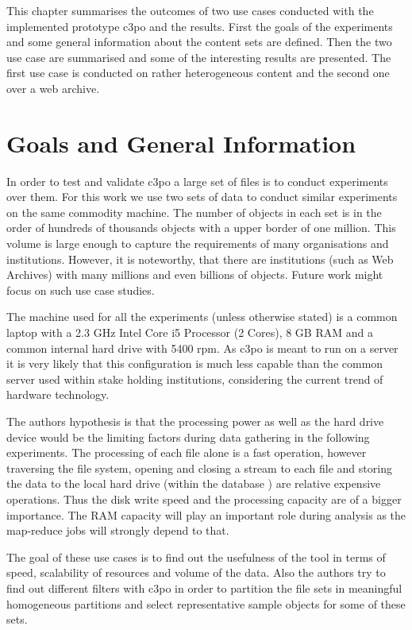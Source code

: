 This chapter summarises the outcomes of two use cases conducted with the implemented prototype c3po and
the results. First the goals of the experiments and some general information about the content sets are defined. Then the two use case are summarised and some of the interesting results are presented. The first use case is conducted on rather heterogeneous content and the second one over a web archive.

\section{Goals and General Information}
In order to test and validate c3po a large set of files is to conduct experiments over them.
For this work we use two sets of data to conduct similar experiments on the same commodity machine. The number of objects in each set is in the order of hundreds of thousands objects with a upper border of one million. This volume is large enough to capture the requirements of many organisations and institutions. However, it is noteworthy, that there are institutions (such as Web Archives) with many millions and even billions of objects. Future work might focus on such use case studies.

The machine used for all the experiments (unless otherwise stated) is a common laptop with a 2.3 GHz Intel Core i5 Processor (2 Cores), 8 GB RAM and a common internal hard drive with 5400 rpm. As c3po is meant to run on a server it is very likely that this configuration is much less capable than the common server used within stake holding institutions, considering the current trend of hardware technology.

The authors hypothesis is that the processing power as well as the hard drive device would be the limiting factors during data gathering in the following experiments. The  processing of each file alone is a fast operation, however traversing the file system, opening and closing a stream to each file and storing the data to the local hard drive (within the database ) are relative expensive operations. Thus the disk write speed and the processing capacity are of a bigger importance. The RAM capacity will play an important role during analysis as the map-reduce jobs will strongly depend to that.

The goal of these use cases is to find out the usefulness of the tool in terms of speed, scalability of resources and volume of the data. Also the authors try to find out different filters with c3po in order to partition the file sets in meaningful homogeneous partitions and select representative sample objects for some of these sets.

